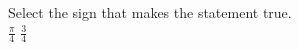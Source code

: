\documentclass{ximera}
\author{David Kish}
\begin{document}
\begin{exercise}
Select the sign that makes the statement true.\\
$\frac{\pi}{4}$ \wordChoice{\choice{$<$}\choice[correct]{$>$}\choice{$=$}} $\frac{3}{4}$ 

\end{exercise}
\end{document}
